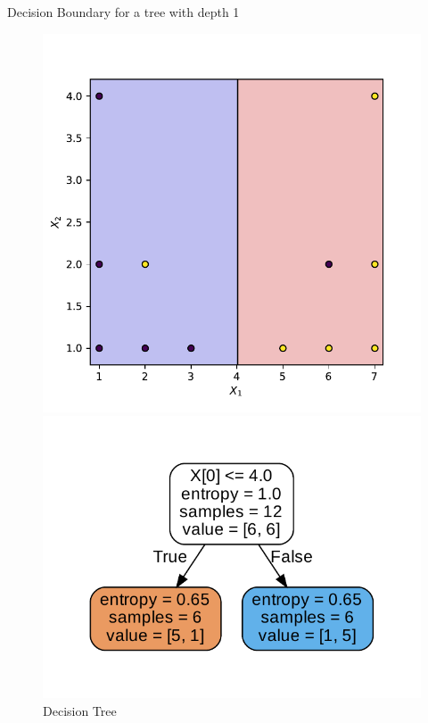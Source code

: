 \documentclass{beamer}
\begin{document}
	\begin{frame}{Decision Boundary for a tree with depth 1}
	\begin{figure}[h]
	    \centering
	    \begin{minipage}{0.45\textwidth}
	        \centering
	        \includegraphics[width=\textwidth]{example-1-depth-1-boundary}
	        \caption{Decision Boundary}
	    \end{minipage}
	    \hfill
	    \begin{minipage}{0.45\textwidth}
	        \centering
	        \includegraphics[width=\textwidth]{example-1-depth-1-decision-tree}
	        \caption{Decision Tree}
	    \end{minipage}
	\end{figure}
	\end{frame}
	
\end{document}
